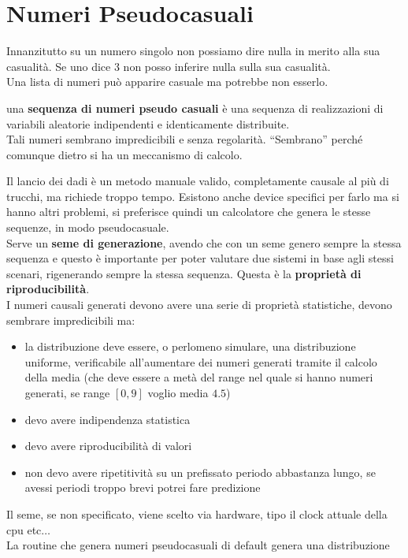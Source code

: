 \message{ !name(modprob.tex)}\documentclass[a4paper,12pt, oneside]{book}
\begin{document}
\section{Numeri Pseudocasuali}
Innanzitutto su un numero singolo non possiamo dire nulla in merito alla sua
casualità. Se uno dice 3 non posso inferire nulla sulla sua casualità.\\
Una lista di numeri può apparire casuale ma potrebbe non esserlo.
\begin{definizione}
  una \textbf{sequenza di numeri pseudo casuali} è una sequenza di realizzazioni
  di 
  variabili aleatorie indipendenti e identicamente distribuite.\\
  Tali numeri sembrano impredicibili e senza regolarità. ``Sembrano'' perché
  comunque dietro si ha un meccanismo di calcolo.
\end{definizione}
Il lancio dei dadi è un metodo manuale valido, completamente causale al più di
trucchi, ma richiede troppo tempo. Esistono anche 
device specifici per farlo ma si hanno altri problemi, si preferisce quindi un
calcolatore che genera le stesse sequenze, in modo pseudocasuale.\\
Serve un \textbf{seme di generazione}, avendo che con un seme genero sempre la
stessa sequenza e questo è importante per poter valutare due sistemi in base
agli stessi scenari, rigenerando sempre la stessa sequenza. Questa è la
\textbf{proprietà di riproducibilità}.\\
I numeri causali generati devono avere una serie di proprietà statistiche,
devono sembrare impredicibili ma:
\begin{itemize}
  \item la distribuzione deve essere, o perlomeno simulare, una distribuzione
  uniforme, 
  verificabile all'aumentare dei 
  numeri generati tramite il calcolo della media (che deve essere a metà del
  range nel quale si hanno numeri generati, se range $[0,9]$ voglio media $4.5$)
  \item devo avere indipendenza statistica
  \item devo avere riproducibilità di valori
  \item non devo avere ripetitività su un prefissato periodo abbastanza lungo,
  se avessi periodi troppo brevi potrei fare predizione
\end{itemize}
Il seme, se non specificato, viene scelto via hardware, tipo il clock attuale
della cpu etc$\ldots$\\
La routine che genera numeri pseudocasuali di default genera una distribuzione
\end{document}
